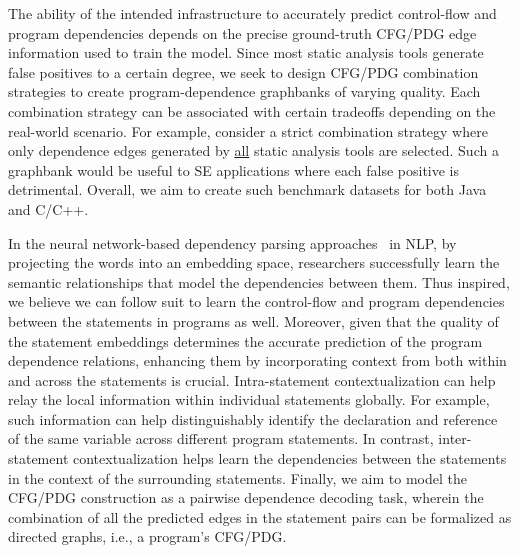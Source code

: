 
 The ability of the intended \tool infrastructure to accurately predict control-flow and program dependencies depends on the precise ground-truth CFG/PDG edge information used to train the model. Since most static analysis tools generate false positives to a certain degree, we seek to design CFG/PDG combination strategies to create program-dependence graphbanks of varying quality. Each combination strategy can be associated with certain tradeoffs depending on the real-world scenario. For example, consider a strict combination strategy where only dependence edges generated by \underline{all} static analysis tools are selected. Such a graphbank would be useful to SE applications where each false positive is detrimental. Overall, we aim to create such benchmark datasets for both Java and C/C++.

\vspace{3pt}
In the neural network-based dependency parsing approaches~\cite{chen-manning-2014-fast} in NLP, by projecting the words into an embedding space, researchers successfully learn the semantic relationships that model the dependencies between them. Thus inspired, we believe we can follow suit to learn the control-flow and program dependencies between the statements in programs as well. Moreover, given that the quality of the statement embeddings determines the accurate prediction of the program dependence relations, enhancing them by incorporating context from both within and across the statements is crucial. Intra-statement contextualization can help relay the local information within individual statements globally. For example, such information can help distinguishably identify the declaration and reference of the same variable across different program statements. In contrast, inter-statement contextualization helps learn the dependencies between the statements in the context of the surrounding statements. Finally, we aim to model the CFG/PDG construction as a pairwise dependence decoding task, wherein the combination of all the predicted edges in the statement pairs can be formalized as directed graphs, i.e., a program's CFG/PDG.

